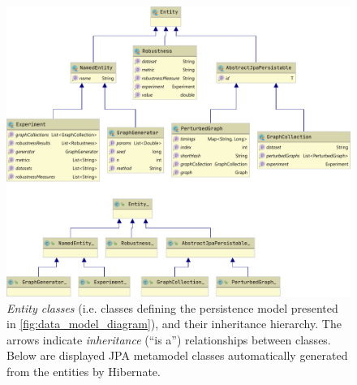 \begin{figure}[H]
\includegraphics[width=\linewidth]{data_model_classes_diagram.pdf}
\caption{\textsl{Entity classes} (i.e. classes defining the persistence model presented in \autoref{fig:data_model_diagram}), and their inheritance hierarchy.
The arrows indicate \textsl{inheritance} (``is a'') relationships between classes.
Below are displayed JPA metamodel classes automatically generated from the entities by Hibernate.}
\label{fig:data_model_classes_diagram}
\end{figure}
